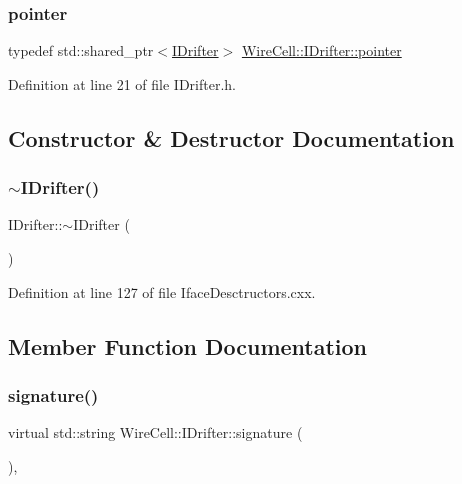 \subsubsection{\texorpdfstring{pointer}{pointer}}
{\footnotesize\ttfamily typedef std\+::shared\+\_\+ptr$<$\hyperlink{class_wire_cell_1_1_i_drifter}{I\+Drifter}$>$ \hyperlink{class_wire_cell_1_1_i_drifter_a2ba4a7cb70359edbc455f7fa711e58d6}{Wire\+Cell\+::\+I\+Drifter\+::pointer}}



Definition at line 21 of file I\+Drifter.\+h.



\subsection{Constructor \& Destructor Documentation}
\mbox{\label{class_wire_cell_1_1_i_drifter_a3f1d99bfce8eb3b203617690dcae04d8}} 
\subsubsection{\texorpdfstring{$\sim$\+I\+Drifter()}{~IDrifter()}}
{\footnotesize\ttfamily I\+Drifter\+::$\sim$\+I\+Drifter (\begin{DoxyParamCaption}{ }\end{DoxyParamCaption})\hspace{0.3cm}{\ttfamily [virtual]}}



Definition at line 127 of file Iface\+Desctructors.\+cxx.



\subsection{Member Function Documentation}
\mbox{\label{class_wire_cell_1_1_i_drifter_af7f5abc751d9bd227d5bed94aa416a13}} 
\subsubsection{\texorpdfstring{signature()}{signature()}}
{\footnotesize\ttfamily virtual std\+::string Wire\+Cell\+::\+I\+Drifter\+::signature (\begin{DoxyParamCaption}{ }\end{DoxyParamCaption})\hspace{0.3cm}{\ttfamily [inline]}, {\ttfamily [virtual]}}

